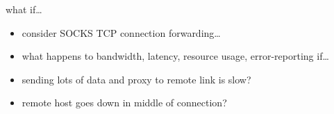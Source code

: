 \begin{frame}{what if\ldots}
    \begin{itemize}
    \item consider SOCKS TCP connection forwarding\ldots
    \item what happens to bandwidth, latency, resource usage, error-reporting if\ldots
    \vspace{.5cm}
    \item sending lots of data and proxy to remote link is slow?
    \item remote host goes down in middle of connection?
    \end{itemize}
\end{frame}

